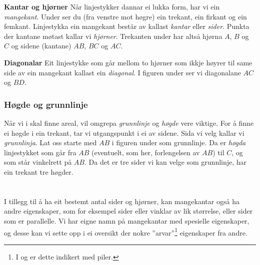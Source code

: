 \begin{comment}
\reg[Samsvarande vinklar]{
	Vinkler med eit høgre eller venstre vinkelbein felles, kallast \textit{samsvarende vinkler}. I figuren under er dei markerte vinklane samsvarande fordi alle tre har den raude linja som venstre vinkelbein.
\fig{vink4}
	Vinklar med parvis parallelle høgre og venstre vinkelbein er like store.
\fig{vink4b}
}
\end{comment}
\newpage
\textbf{Kantar og hjørner} \os
Når linjestykker dannar ei lukka form, har vi ein \textit{mangekant}. Under ser du (fra venstre mot høgre) ein trekant, ein firkant og ein femkant.
Linjestykka ein mangekant består av kallast \textit{kantar} eller \textit{sider}. Punkta der kantane møtast kallar vi \textit{hjørner}. Trekanten under har altså hjørna $ A $, $ B $ og $ C $ og sidene (kantane) $ AB $, $ BC $ og $ AC $.
 \vsk

\textbf{Diagonalar} \os
Eit linjestykke som går mellom to hjørner som ikkje høyrer til same side av ein mangekant kallast ein \textit{diagonal}. I figuren under ser vi diagonalane $ AC $ og $ BD $.
\newpage
\subsubsection{Høgde og grunnlinje}
Når vi i  skal finne areal, vil omgrepa \textit{grunnlinje} og \textit{høgde} vere viktige. For å finne ei høgde i ein trekant, tar vi utgangspunkt i ei av sidene. Sida vi velg kallar vi \textit{grunnlinja}. Lat oss starte med $ AB $ i figuren under som grunnlinje. Da er \textit{høgda} linjestykket som går fra $ AB $ (eventuelt, som her, forlengelsen av $ AB $) til $ C $, og som står vinkelrett på $ AB $.
Da det er tre sider vi kan velge som grunnlinje, har ein trekant tre høgder.
\section{\eignsk}
I tillegg til å ha eit bestemt antal sider og hjørner, kan mangekantar også ha andre eigenskaper, som for eksempel sider eller vinklar av lik størrelse, eller sider som er parallelle. Vi har eigne namn på mangekantar med spesielle eigenskaper, og desse kan vi sette opp i ei oversikt der nokre ''arvar''\footnote{I  og  er dette indikert med piler.} eigenskaper fra andre.\regv


